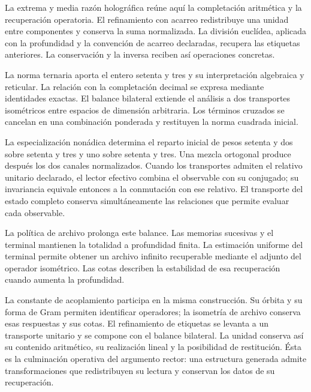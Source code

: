 
La extrema y media razón holográfica reúne aquí la completación
aritmética y la recuperación operatoria. El refinamiento con acarreo
redistribuye una unidad entre componentes y conserva la suma
normalizada. La división euclídea, aplicada con la profundidad y
la convención de acarreo declaradas, recupera las etiquetas
anteriores. La conservación y la inversa reciben así operaciones
concretas.

La norma ternaria aporta el entero setenta y tres y su interpretación
algebraica y reticular. La relación con la completación decimal
se expresa mediante identidades exactas. El balance bilateral
extiende el análisis a dos transportes isométricos entre espacios
de dimensión arbitraria. Los términos cruzados se cancelan en
una combinación ponderada y restituyen la norma cuadrada inicial.

La especialización nonádica determina el reparto inicial de pesos
setenta y dos sobre setenta y tres y uno sobre setenta y tres.
Una mezcla ortogonal produce después los dos canales normalizados.
Cuando los transportes admiten el relativo unitario declarado,
el lector efectivo combina el observable con su conjugado; su
invariancia equivale entonces a la conmutación con ese relativo. El transporte
del estado completo conserva simultáneamente las relaciones
que permite evaluar cada observable.

La política de archivo prolonga este balance. Las memorias
sucesivas y el terminal mantienen la totalidad a profundidad
finita. La estimación uniforme del terminal permite obtener
un archivo infinito recuperable mediante el adjunto del operador
isométrico. Las cotas describen la estabilidad de esa recuperación
cuando aumenta la profundidad.

La constante de acoplamiento participa en la misma construcción.
Su órbita y su forma de Gram permiten identificar operadores;
la isometría de archivo conserva esas respuestas y sus cotas.
El refinamiento de etiquetas se levanta a un transporte unitario
y se compone con el balance bilateral. La unidad conserva así
su contenido aritmético, su realización lineal y la posibilidad
de restitución. Ésta es la culminación operativa del argumento
rector: una estructura generada admite transformaciones que
redistribuyen su lectura y conservan los datos de su recuperación.
